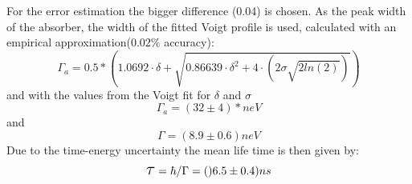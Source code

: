 For the error estimation the bigger difference (0.04) is chosen. As the peak width of the absorber, the width of the fitted Voigt profile is used, calculated with an empirical  approximation($0.02\%$ accuracy)\cite{Olivero}:
\begin{equation}
\Gamma_a=0.5*(1.0692\cdot \delta+\sqrt{0.86639\cdot \delta^2 + 4\cdot (2\sigma\sqrt{2ln(2)})})
\end{equation}
and with the values from the Voigt fit for $\delta$ and $\sigma$
\begin{equation}
\Gamma_a=(32\pm4)*neV
\end{equation}
and
\begin{equation}
\Gamma=(8.9\pm0.6)neV
\end{equation}
Due to the time-energy uncertainty the mean life time is then given by:
\begin{equation}
\scalebox{1.5}{$\tau$}=\hbar/\Gamma=()6.5\pm0.4)ns
\end{equation}